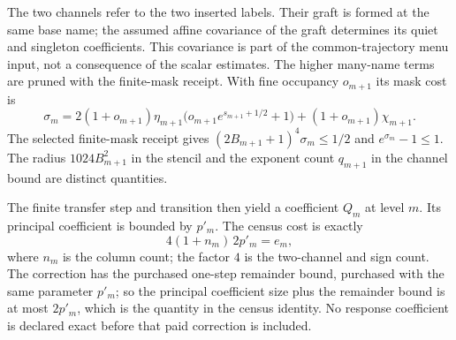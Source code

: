 The two channels refer to the two inserted labels. Their graft is formed
at the same base name; the assumed affine covariance of the graft
determines its quiet and singleton coefficients. This covariance is part of the common-trajectory
menu input, not a consequence of the scalar estimates. The higher
many-name terms are pruned with the finite-mask receipt. With fine
occupancy $o_{m+1}$ its mask cost is
\[
 \sigma_m=2(1+o_{m+1})\eta_{m+1}
       \bigl(o_{m+1}e^{s_{m+1}+1/2}+1\bigr)
       +(1+o_{m+1})\chi_{m+1}.
\]
The selected finite-mask receipt gives
$(2B_{m+1}+1)^4\sigma_m\leq1/2$ and
$e^{\sigma_m}-1\leq1$. The radius $1024B_{m+1}^2$ in the stencil and
the exponent count $q_{m+1}$ in the channel bound are distinct quantities.

The finite transfer step and transition then yield a coefficient $Q_m$ at
level $m$. Its principal coefficient is bounded by $p'_m$. The census
cost is exactly
\[
 4(1+n_m)\,2p'_m=e_m,
\]
where $n_m$ is the column count; the factor $4$ is the two-channel
and sign count. The correction has the purchased one-step remainder
bound, purchased with the same parameter $p'_m$; so the principal
coefficient size plus the remainder bound is at most $2p'_m$, which is the
quantity in the census identity.  No response coefficient is declared exact
before that paid correction is included.

